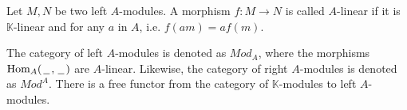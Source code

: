 \documentclass[../thesis.tex]{subfiles}
\begin{document}
\begin{definition}[Modules]



    

    
    

            \end{definition}

            \begin{definition}
                Let $M,N$ be two left $A$-modules. A morphism $f:M\rightarrow N$ is called $A$-linear if it is $\mathbb{K}$-linear and for any $a$ in $A$, i.e. $f(am) = af(m)$.
            \end{definition}

            The category of left $A$-modules is denoted as $Mod_A$, where the morphisms $\text{Hom}_A(\hspace{0.05cm}\underline{\hspace{0.2cm}}\hspace{0.05cm},\hspace{0.05cm}\underline{\hspace{0.2cm}}\hspace{0.05cm})$ are $A$-linear. Likewise, the category of right $A$-modules is denoted as $Mod^A$. There is a free functor from the category of $\mathbb{K}$-modules to left $A$-modules.
\end{document}
